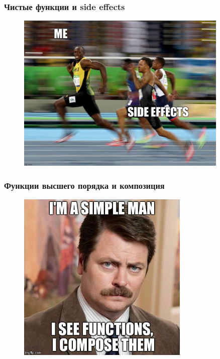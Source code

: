 \documentclass[18pt, compress]{beamer}
\begin{document}
\begin{frame}
    \frametitle{Чистые функции и side effects}
    \vspace{-20pt}
    \begin{figure}
        \includegraphics[width=0.9\textwidth,center]{side_effect.jpg}
    \end{figure}
\end{frame}

\begin{frame}
    \frametitle{Функции высшего порядка и композиция}
    \vspace{-25pt}
    \begin{figure}
        \includegraphics[width=0.73\textwidth,center]{function_composition.jpg}
    \end{figure}
\end{frame}
\end{document}
